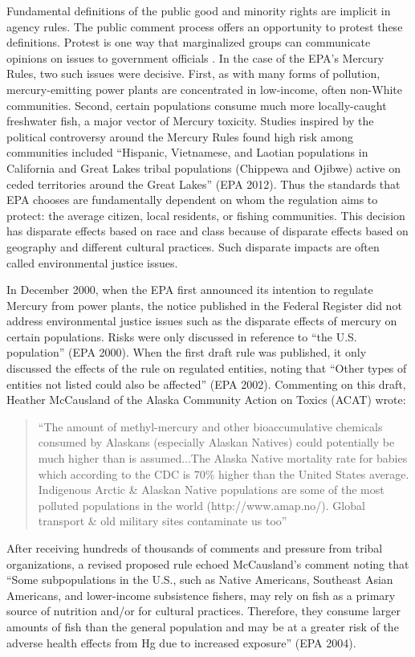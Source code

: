 Fundamental definitions of the public good and minority rights are implicit in agency rules. The public comment process offers an opportunity to protest these definitions. Protest is one way that marginalized groups can communicate opinions on issues to government officials \citep{Gillion2013}. %
In the case of the EPA's Mercury Rules, two such issues were decisive. First, as with many forms of pollution, mercury-emitting power plants are concentrated in low-income, often non-White communities. Second, certain populations consume much more locally-caught freshwater fish, a major vector of Mercury toxicity. Studies inspired by the political controversy around the Mercury Rules found high risk among communities included ``Hispanic, Vietnamese, and Laotian populations in California and Great Lakes tribal populations (Chippewa and Ojibwe) active on ceded territories around the Great Lakes'' (EPA 2012). Thus the standards that EPA chooses are fundamentally dependent on whom the regulation aims to protect: the average citizen, local residents, or fishing communities. This decision has disparate effects based on race and class because of disparate effects based on geography and different cultural practices. Such disparate impacts are often called environmental justice issues.

In December 2000, when the EPA first announced its intention to regulate Mercury from power plants, the notice published in the Federal Register did not address environmental justice issues such as the disparate effects of mercury on certain populations. Risks were only discussed in reference to ``the U.S. population'' (EPA 2000). When the first draft rule was published, it only discussed the effects of the rule on regulated entities, noting that ``Other types of entities not listed could also be affected'' (EPA 2002). Commenting on this draft, Heather McCausland of the Alaska Community Action on Toxics (ACAT) wrote:
\begin{quotation}
``The amount of methyl-mercury and other bioaccumulative chemicals consumed by Alaskans (especially Alaskan Natives) could potentially be much higher than is assumed...The Alaska Native mortality rate for babies which according to the CDC is 70\% higher than the United States average. Indigenous Arctic \& Alaskan Native populations are some of the most polluted populations in the world (http://www.amap.no/). Global transport \& old military sites contaminate us too''
\end{quotation}

After receiving hundreds of thousands of comments and pressure from tribal organizations, a revised proposed rule echoed McCausland's comment noting that ``Some subpopulations in the U.S., such as Native Americans, Southeast Asian Americans, and lower-income subsistence fishers, may rely on fish as a primary source of nutrition and/or for cultural practices. Therefore, they consume larger amounts of fish than the general population and may be at a greater risk of the adverse health effects from Hg due to increased exposure'' (EPA 2004). 


